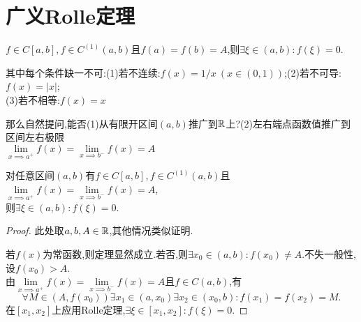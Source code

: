 \documentclass[UTF8]{book}
\begin{document}
    \section{广义Rolle定理}
    \begin{theorem}[Rolle定理]
        $f\in C[a,b],f\in C^{(1)}(a,b)$且$f(a)=f(b)=A$,则$\exists \xi\in(a,b):f(\xi)=0$.
    \end{theorem}
    其中每个条件缺一不可:(1)若不连续:$f(x)=1/x~(x\in(0,1))$;(2)若不可导:$f(x)=|x|$;\\ (3)若不相等:$f(x)=x$

    那么自然提问,能否(1)从有限开区间$(a,b)$推广到$\mathbb{R}$上?(2)左右端点函数值推广到区间左右极限\\ $\lim\limits_{x\implies a^+}f(x)=\lim\limits_{x\implies b^-}f(x)=A$
    \begin{theorem}[广义Rolle定理]
        对任意区间$(a,b)$有$f\in C[a,b],f\in C^{(1)}(a,b)$且$\lim\limits_{x\implies a^+}f(x)=\lim\limits_{x\implies b^-}f(x)=A$,\\ 则$\exists \xi\in(a,b):f(\xi)=0$.
    \end{theorem}
    \begin{proof}
        此处取$a,b,A\in\mathbb{R}$,其他情况类似证明.

        若$f(x)$为常函数,则定理显然成立.若否,则$\exists x_0\in(a,b):f(x_0)\neq A$.不失一般性,设$f(x_0)>A$.\\ 由$\lim\limits_{x\implies a^+}f(x)=\lim\limits_{x\implies b^-}f(x)=A$且$f\in C(a,b)$,有$$\forall M\in (A,f(x_0))\exists x_1\in (a,x_0)\exists x_2\in (x_0,b):f(x_1)=f(x_2)=M.$$
        在$[x_1,x_2]$上应用Rolle定理,$\exists \xi\in[x_1,x_2]:f(\xi)=0.$
    \end{proof}
\end{document}
